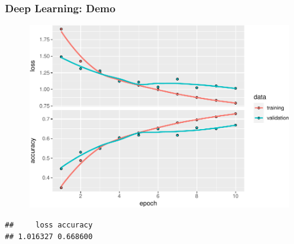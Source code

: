 \documentclass[
  shownotes,
  xcolor={svgnames},
  hyperref={colorlinks,citecolor=DarkBlue,linkcolor=DarkRed,urlcolor=DarkBlue}
  , aspectratio=169]{beamer}
\newenvironment{Shaded}{\begin{snugshade}}{\end{snugshade}}
\newcommand{\DataTypeTok}[1]{\textcolor[rgb]{0.13,0.29,0.53}{#1}}
\newcommand{\DecValTok}[1]{\textcolor[rgb]{0.00,0.00,0.81}{#1}}
\newcommand{\KeywordTok}[1]{\textcolor[rgb]{0.13,0.29,0.53}{\textbf{#1}}}
\newcommand{\NormalTok}[1]{#1}
\newcommand{\OperatorTok}[1]{\textcolor[rgb]{0.81,0.36,0.00}{\textbf{#1}}}
\begin{document}
\begin{frame}[fragile]
\frametitle{Deep Learning: Demo}

  \begin{figure}[H] \centering
            \captionsetup{justification=centering}
              \includegraphics[scale=0.5]{figures/unnamed-chunk-7-1.pdf}
              \\
              \tiny
             
 \end{figure}

\begin{scriptsize}

\begin{Shaded}
\end{Shaded}

\begin{verbatim}
##     loss accuracy 
## 1.016327 0.668600
\end{verbatim}

\end{scriptsize}

\end{frame}

\end{document}
